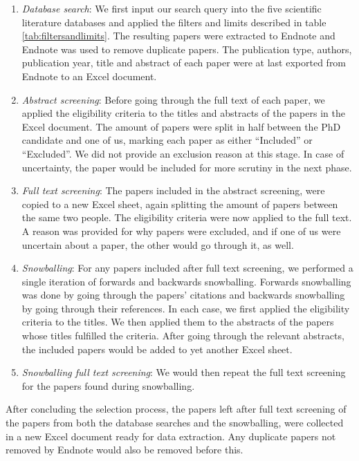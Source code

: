 \begin{enumerate}
    \item \textit{Database search}: We first input our search query into the five scientific literature databases and applied the filters and limits described in table \ref{tab:filtersandlimits}. The resulting papers were extracted to Endnote and Endnote was used to remove duplicate papers. The publication type, authors, publication year, title and abstract of each paper were at last exported from Endnote to an Excel document.
    \item \textit{Abstract screening}: Before going through the full text of each paper, we applied the eligibility criteria to the titles and abstracts of the papers in the Excel document. The amount of papers were split in half between the PhD candidate and one of us, marking each paper as either ``Included'' or ``Excluded''. We did not provide an exclusion reason at this stage. In case of uncertainty, the paper would be included for more scrutiny in the next phase.
    \item \textit{Full text screening}: The papers included in the abstract screening, were copied to a new Excel sheet, again splitting the amount of papers between the same two people. The eligibility criteria were now applied to the full text. A reason was provided for why papers were excluded, and if one of us were uncertain about a paper, the other would go through it, as well.
    \item \textit{Snowballing}: For any papers included after full text screening, we performed a single iteration of forwards and backwards snowballing. Forwards snowballing was done by going through the papers' citations and backwards snowballing by going through their references. In each case, we first applied the eligibility criteria to the titles. We then applied them to the abstracts of the papers whose titles fulfilled the criteria. After going through the relevant abstracts, the included papers would be added to yet another Excel sheet.
    \item \textit{Snowballing full text screening}: We would then repeat the full text screening for the papers found during snowballing.
\end{enumerate}

After concluding the selection process, the papers left after full text screening of the papers from both the database searches and the snowballing, were collected in a new Excel document ready for data extraction. Any duplicate papers not removed by Endnote would also be removed before this.

